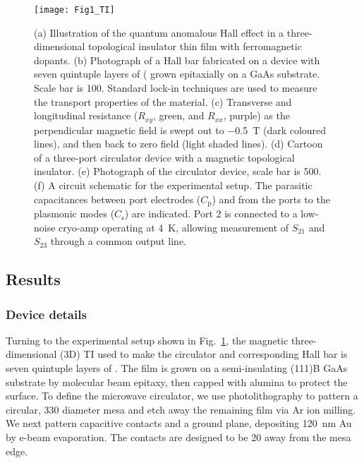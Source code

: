 \begin{figure}
\texttt{[image: Fig1\_TI]}
\caption[A three-dimensional topological insulator based circulator]{\label{fig:fig1_ti}(a) Illustration of the quantum anomalous Hall effect in a three-dimensional topological insulator thin film with ferromagnetic dopants. (b) Photograph of a Hall bar fabricated on a device with seven quintuple layers of ( grown epitaxially on a GaAs substrate. Scale bar is \SI{100}{\micron}. Standard lock-in techniques are used to measure the transport properties of the material. (c) Transverse and longitudinal resistance ($R_{xy}$, green, and $R_{xx}$, purple) as the perpendicular magnetic field is swept out to \SI{-0.5}{\tesla} (dark coloured lines), and then back to zero field (light shaded lines). (d) Cartoon of a three-port circulator device with a magnetic topological insulator.  (e) Photograph of the circulator device, scale bar is \SI{500}{\micron}. (f) A circuit schematic for the experimental setup. The parasitic capacitances between port electrodes ($C_\textrm{p}$) and from the ports to the plasmonic modes ($C_\textrm{s}$) are indicated. Port 2 is connected to a low-noise cryo-amp operating at \SI{4}{\kelvin}, allowing measurement of $S_{21}$ and $S_{23}$ through a common output line.}
\end{figure}

\subsection{Results}
\subsubsection{Device details} Turning to the experimental setup shown in Fig.~\ref{fig:fig1_ti}, the magnetic three-dimensional (3D) TI used to make the circulator and corresponding Hall bar is seven quintuple layers of . The film is grown on a semi-insulating (111)B GaAs substrate by molecular beam epitaxy, then capped with alumina to protect the surface. To define the microwave circulator, we use photolithography to pattern a circular, \SI{330}{\micron} diameter mesa and etch away the remaining film via Ar ion milling. We next pattern capacitive contacts and a ground plane, depositing \SI{120}{\nano\meter} Au by e-beam evaporation. The contacts are designed to be \SI{20}{\micron} away from the mesa edge.

